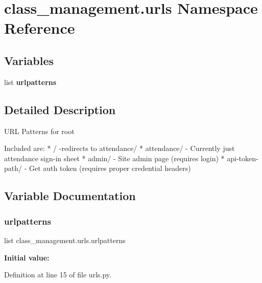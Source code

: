 \hypertarget{namespaceclass__management_1_1urls}{}\section{class\+\_\+management.\+urls Namespace Reference}
\label{namespaceclass__management_1_1urls}
\subsection*{Variables}
\begin{DoxyCompactItemize}
\item 
list {\bfseries urlpatterns}
\end{DoxyCompactItemize}


\subsection{Detailed Description}
\begin{DoxyVerb}URL Patterns for root

Included are:
* / -redirects to attendance/
* attendance/ - Currently just attendance sign-in sheet
* admin/ - Site admin page (requires login)
* api-token-path/ - Get auth token (requires proper credential headers)
\end{DoxyVerb}
 

\subsection{Variable Documentation}
\hypertarget{namespaceclass__management_1_1urls_ac6e0d8ce92ae187a6750ae8716501bb8}{}\label{namespaceclass__management_1_1urls_ac6e0d8ce92ae187a6750ae8716501bb8} 
\subsubsection{\texorpdfstring{urlpatterns}{urlpatterns}}
{\footnotesize\ttfamily list class\+\_\+management.\+urls.\+urlpatterns}

{\bfseries Initial value\+:}


Definition at line 15 of file urls.\+py.

